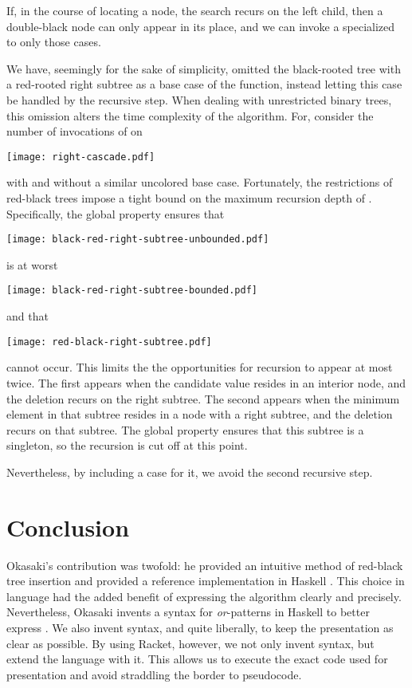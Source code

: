 \documentclass[preprint]{sigplanconf}
\begin{document}
If, in the course of locating a node, the search recurs on the left child, then a double-black node can only appear in its place, and we can invoke a  specialized to only those cases. 

We have, seemingly for the sake of simplicity, omitted the black-rooted tree with a red-rooted right subtree as a base case of the  function, instead letting this case be handled by the recursive step. When dealing with unrestricted binary trees, this omission alters the time complexity of the algorithm. For, consider the number of invocations of  on
\begin{center}
\texttt{[image: right-cascade.pdf]}
\end{center}
with and without a similar uncolored base case. Fortunately, the restrictions of red-black trees impose a tight bound on the maximum recursion depth of . Specifically, the global property ensures that
\begin{center}
\texttt{[image: black-red-right-subtree-unbounded.pdf]}
\end{center}
is at worst
\begin{center}
\texttt{[image: black-red-right-subtree-bounded.pdf]}
\end{center}
and that
\begin{center}
\texttt{[image: red-black-right-subtree.pdf]}
\end{center}
cannot occur. This limits the the opportunities for recursion to appear at most twice. The first appears when the candidate value resides in an interior node, and the deletion recurs on the right subtree. The second appears when the minimum element in that subtree resides in a node with a right subtree, and the deletion recurs on that subtree. The global property ensures that this subtree is a singleton, so the recursion is cut off at this point.

Nevertheless, by including a case for it, we avoid the second recursive step.

\section{Conclusion}

Okasaki's contribution was twofold: he provided an intuitive method of red-black tree insertion and provided a reference implementation in Haskell \cite{hudak1992report}. This choice in language had the added benefit of expressing the algorithm clearly and precisely. Nevertheless, Okasaki invents a syntax for \emph{or}-patterns in Haskell to better express . We also invent syntax, and quite liberally, to keep the presentation as clear as possible. By using Racket, however, we not only invent syntax, but extend the language with it. This allows us to execute the exact code used for presentation and avoid straddling the border to pseudocode.
\end{document}
